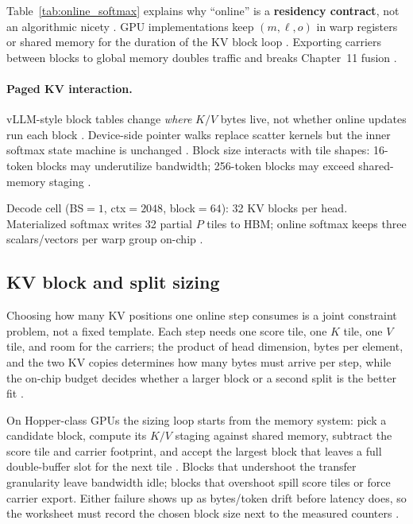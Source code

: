 Table~\ref{tab:online_softmax} explains why ``online'' is a \textbf{residency contract}, not an algorithmic nicety \citep{memoryfloor2026,patel2025llminference}. GPU implementations keep $(m,\ell,o)$ in warp registers or shared memory for the duration of the KV block loop \citep{semianalysis2024tma,nvidia2022hopper}. Exporting carriers between blocks to global memory doubles traffic and breaks Chapter~11 fusion \citep{taxbreak2026,yirage2026}.

\paragraph{Paged KV interaction.} vLLM-style block tables change \emph{where} $K/V$ bytes live, not whether online updates run each block \citep{kwon2023vllm}. Device-side pointer walks replace scatter kernels but the inner softmax state machine is unchanged \citep{patel2025llminference}. Block size interacts with tile shapes: 16-token blocks may underutilize bandwidth; 256-token blocks may exceed shared-memory staging \citep{dao2023flashdecoding,semianalysis2024tma}.

\begin{example}
Decode cell (BS${=}1$, ctx${=}2048$, block${=}64$): 32 KV blocks per head. Materialized softmax writes 32 partial $P$ tiles to HBM; online softmax keeps three scalars/vectors per warp group on-chip \citep{dao2022flashattention,memoryfloor2026,taxbreak2026}.
\end{example}

\subsection{KV block and split sizing}
\label{sec:ch10_block_sizing}

Choosing how many KV positions one online step consumes is a joint constraint problem, not a fixed template. Each step needs one score tile, one $K$ tile, one $V$ tile, and room for the carriers; the product of head dimension, bytes per element, and the two KV copies determines how many bytes must arrive per step, while the on-chip budget decides whether a larger block or a second split is the better fit \citep{memoryfloor2026,dao2022flashattention}.

On Hopper-class GPUs the sizing loop starts from the memory system: pick a candidate block, compute its $K/V$ staging against shared memory, subtract the score tile and carrier footprint, and accept the largest block that leaves a full double-buffer slot for the next tile \citep{semianalysis2024tma,nvidia2022hopper}. Blocks that undershoot the transfer granularity leave bandwidth idle; blocks that overshoot spill score tiles or force carrier export. Either failure shows up as bytes/token drift before latency does, so the worksheet must record the chosen block size next to the measured counters \citep{memoryfloor2026,taxbreak2026}.

